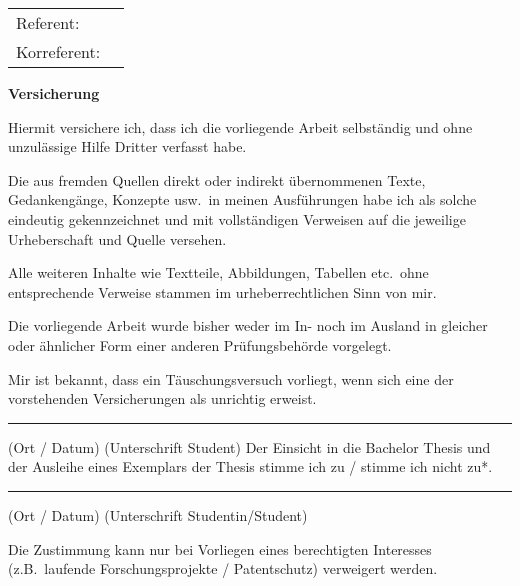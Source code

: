 \vfill
\begin{flushleft}
\begin{tabular}{ll}
    Referent:	 &  \Referent \\[0.5ex]
    Korreferent:	 &  \Korreferent
\end{tabular}        
\end{flushleft}
\newpage
\thispagestyle{empty}
\rule[0ex]{0ex}{0ex} 	%
\newpage
\thispagestyle{empty} 
%
{\bf Versicherung}
\par
Hiermit versichere ich, dass ich die vorliegende Arbeit selbst\"andig und ohne unzul\"assige Hilfe Dritter verfasst 
habe.
\par
Die aus fremden Quellen direkt oder indirekt \"ubernommenen Texte, Gedankeng\"ange, Konzepte usw.\ in meinen 
Ausf\"uhrungen habe ich als solche eindeutig gekennzeichnet und mit vollst\"andigen Verweisen auf die jeweilige 
Urheberschaft und Quelle versehen.
\par
Alle weiteren Inhalte wie Textteile, Abbildungen, Tabellen etc.\ ohne entsprechende Verweise stammen im 
urheberrechtlichen Sinn von mir.
\par
Die vorliegende Arbeit wurde bisher weder im In- noch im Ausland in gleicher oder \"ahnlicher Form einer anderen 
Pr\"ufungsbeh\"orde vorgelegt.
\par
Mir ist bekannt, dass ein T\"auschungsversuch vorliegt, wenn sich eine der vorstehenden Versicherungen als 
unrichtig erweist.
\par
\vspace{25mm}
\rule[0ex]{\textwidth}{0.4pt}
(Ort / Datum)\hspace{30ex}	(Unterschrift Student)
\newpage
\thispagestyle{empty} 
%
Der Einsicht in die Bachelor Thesis  und der Ausleihe eines Exemplars der Thesis stimme ich zu / stimme ich nicht zu*.
\par\vspace{10mm}
\rule[0ex]{\textwidth}{0.4pt}
(Ort / Datum)\hspace{30ex}	(Unterschrift Studentin/Student)
\par\vspace{10mm}
Die Zustimmung kann nur bei Vorliegen eines berechtigten Interesses (z.B.\ laufende Forschungsprojekte / Patentschutz) 
verweigert werden. 
\par
